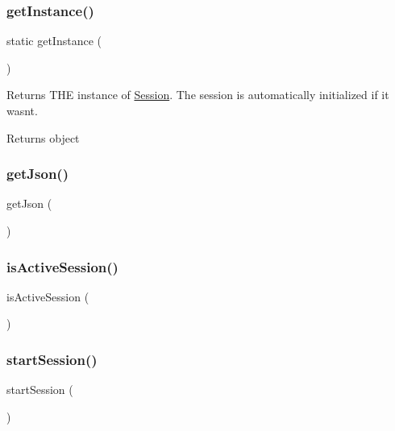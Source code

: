 \subsubsection{\texorpdfstring{get\+Instance()}{getInstance()}}
{\footnotesize\ttfamily static get\+Instance (\begin{DoxyParamCaption}{ }\end{DoxyParamCaption})\hspace{0.3cm}{\ttfamily [static]}}

Returns T\+HE instance of \textquotesingle{}\mbox{\hyperlink{class_session}{Session}}\textquotesingle{}. The session is automatically initialized if it wasn\textquotesingle{}t.

\begin{DoxyReturn}{Returns}
object 
\end{DoxyReturn}
\mbox{\label{class_session_a813b222d556e555333c2313e17b05bce}} 
\subsubsection{\texorpdfstring{get\+Json()}{getJson()}}
{\footnotesize\ttfamily get\+Json (\begin{DoxyParamCaption}{ }\end{DoxyParamCaption})}

\mbox{\label{class_session_abb17bf50828c55bc3207ac605a5c3088}} 
\subsubsection{\texorpdfstring{is\+Active\+Session()}{isActiveSession()}}
{\footnotesize\ttfamily is\+Active\+Session (\begin{DoxyParamCaption}{ }\end{DoxyParamCaption})}

\mbox{\label{class_session_a1e201c0957bc704471a78cd492174871}} 
\subsubsection{\texorpdfstring{start\+Session()}{startSession()}}
{\footnotesize\ttfamily start\+Session (\begin{DoxyParamCaption}{ }\end{DoxyParamCaption})}

